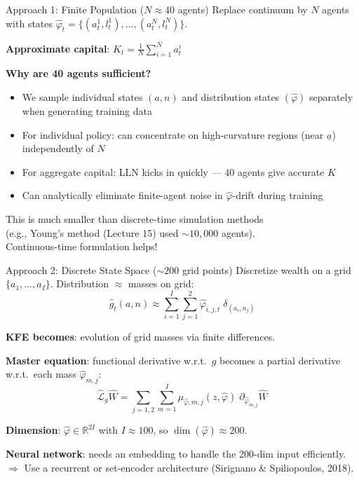\documentclass[aspectratio=169,11pt]{beamer}
\newcommand{\emphc}[1]{\textcolor{harvardcrimson}{#1}}
\newcommand{\R}{\mathbb{R}}
\newcommand{\ubar}[1]{\underline{#1}}
\begin{document}
\begin{frame}{Approach 1: Finite Population ($N \approx 40$ agents)}
\small
Replace continuum by $N$ agents with states $\hat{\varphi}_t = \{(a_t^1, l_t^1), \ldots, (a_t^N, l_t^N)\}$.

\vspace{0.2em}
\textbf{Approximate capital}: $K_t = \frac{1}{N}\sum_{i=1}^N a_t^i$

\vspace{0.2em}
\textbf{Why are 40 agents sufficient?}
\begin{itemize}\itemsep2pt
    \item We sample individual states $(a,n)$ and distribution states $(\hat{\varphi})$ \emphc{separately} when generating training data
    \item For individual policy: can concentrate on high-curvature regions (near $\ubar{a}$) independently of $N$
    \item For aggregate capital: LLN kicks in quickly --- 40 agents give accurate $K$
    \item Can analytically eliminate finite-agent noise in $\hat{\varphi}$-drift during training
\end{itemize}

\vspace{0.2em}
\begin{center}
\colorbox{uzhgreylight}{\parbox{0.7\textwidth}{\centering\small
This is much smaller than discrete-time simulation methods\\
(e.g., Young's method (Lecture 15) used $\sim 10{,}000$ agents).\\
Continuous-time formulation helps!}}
\end{center}
\end{frame}

\begin{frame}{Approach 2: Discrete State Space ($\sim 200$ grid points)}
\small
Discretize wealth on a grid $\{a_1, \ldots, a_I\}$. Distribution $\approx$ masses on grid:
\[
\hat{g}_t(a,n) \approx \sum_{i=1}^{I}\sum_{j=1}^{2} \hat{\varphi}_{i,j,t}\;\delta_{(a_i, n_j)}
\]

\vspace{0.1em}
\textbf{KFE becomes}: evolution of grid masses via \emphc{finite differences}.

\vspace{0.2em}
\textbf{Master equation}: functional derivative w.r.t.\ $g$ becomes a \emphc{partial derivative} w.r.t.\ each mass $\hat{\varphi}_{m,j}$:
\[
\hat{\mathcal{L}}_g \hat{W} = \sum_{j=1,2}\sum_{m=1}^{I} \mu_{\hat{\varphi},m,j}(z, \hat{\varphi})\;\partial_{\hat{\varphi}_{m,j}}\hat{W}
\]

\vspace{0.1em}
\textbf{Dimension}: $\hat{\varphi} \in \R^{2I}$ with $I \approx 100$, so $\dim(\hat{\varphi}) \approx 200$.

\vspace{0.2em}
\textbf{Neural network}: needs an \emphc{embedding} to handle the 200-dim input efficiently.\\
$\Rightarrow$ Use a recurrent or set-encoder architecture (Sirignano \& Spiliopoulos, 2018).
\end{frame}
\end{document}
